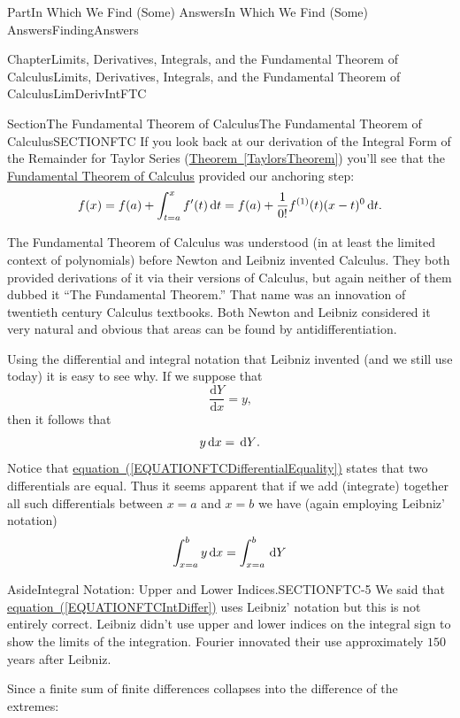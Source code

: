 \documentclass[oneside,10pt,]{book}
\newcommand{\xreffont}{\relax}
\numberwithin{equation}{part}
\newcommand{\dx}[1]{\,{\rm d}#1}
\newcommand{\dfdx}[2]{\frac{\text{d}{#1}}{\text{d}{#2}}}
\begin{document}
\begin{partptx}{Part}{In Which We Find (Some) Answers}{}{In Which We Find (Some) Answers}{}{}{FindingAnswers}
\begin{chapterptx}{Chapter}{Limits, Derivatives, Integrals, and the Fundamental Theorem of Calculus}{}{Limits, Derivatives, Integrals, and the Fundamental Theorem of Calculus}{}{}{LimDerivIntFTC}
\begin{sectionptx}{Section}{The Fundamental Theorem of Calculus}{}{The Fundamental Theorem of Calculus}{}{}{SECTIONFTC}
If you look back at our derivation of the Integral Form of the Remainder for Taylor Series (\hyperref[TaylorsTheorem]{Theorem~{\xreffont\ref{TaylorsTheorem}}}) you'll see that the \hyperref[THEOREMFTCCauchy]{Fundamental Theorem of Calculus} provided  our anchoring step:%
\begin{equation*}
f(x)=f(a)+\int_{t=a}^xf^\prime(t)\dx{t}=f(a)+\frac{1}{0!}f^{(1)}(t)(x-t)^0\dx{t}\text{.}
\end{equation*}
%
\par
The Fundamental Theorem of Calculus was understood (in at least the limited context of polynomials) before Newton and Leibniz invented Calculus.      They both provided derivations of it via their versions of Calculus, but again neither of them dubbed it ``The Fundamental Theorem.'' That name was an innovation of twentieth century Calculus textbooks.  Both Newton and Leibniz considered it very natural and obvious that areas can be found by antidifferentiation.%
\par
Using the differential and integral notation that Leibniz invented (and we still use today) it is easy to see why. If we suppose that%
\begin{equation*}
\dfdx{Y}{x}=y\text{,}
\end{equation*}
then it follows that%
\begin{equation}
y\dx{x}=\dx{Y} \text{.}\label{EQUATIONFTCDifferentialEquality}
\end{equation}
Notice that \hyperref[EQUATIONFTCDifferentialEquality]{equation~({\xreffont\ref{EQUATIONFTCDifferentialEquality}})} states that two differentials are equal. Thus it seems apparent that if we add (integrate) together all such differentials between \(x=a\) and \(x=b\) we have (again employing Leibniz' notation)%
\begin{equation}
\int^b_{x=a}{y\dx{x}}=\int^b_{x=a}{\dx{Y}}\label{EQUATIONFTCIntDiffer}
\end{equation}
%
\begin{aside}{Aside}{Integral Notation: Upper and Lower Indices.}{SECTIONFTC-5}%
We said that \hyperref[EQUATIONFTCIntDiffer]{equation~({\xreffont\ref{EQUATIONFTCIntDiffer}})} uses Leibniz' notation but this is not entirely correct. Leibniz didn't use upper and lower indices on the integral sign to show the limits of the integration.  Fourier innovated their use approximately \(150\) years after Leibniz.%
\end{aside}
Since  a finite sum of finite differences collapses into the difference of the extremes:%
\begin{equation*}

\end{equation*}
\end{sectionptx}
\end{chapterptx}
\end{partptx}
\end{document}
